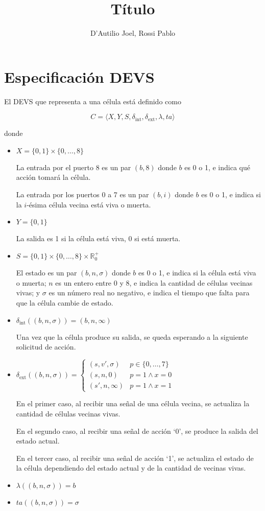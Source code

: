 \documentclass[12pt]{article}
\title{Título}
\author{D'Autilio Joel, Rossi Pablo}
\date{}
\newcommand{\dint}{\delta_{\text{int}}}
\newcommand{\dext}{\delta_{\text{ext}}}
\begin{document}
\maketitle

\section{Especificación DEVS}

El DEVS que representa a una célula está definido como

\[ C = \langle X, Y, S, \dint, \dext, \lambda, ta \rangle \]

donde
\begin{itemize}
  \item $X = \{0, 1\} \times \{0, \dots, 8\}$

    La entrada por el puerto 8 es un par $(b, 8)$ donde $b$ es 0 o 1, e indica qué acción tomará la célula.

    La entrada por los puertos 0 a 7 es un par $(b, i)$ donde $b$ es 0 o 1, e indica si la $i$-ésima célula vecina está viva o muerta.

  \item $Y = \{0, 1\}$

    La salida es 1 si la célula está viva, 0 si está muerta.

  \item $S = \{0, 1\} \times \{0, \dots, 8\} \times \mathbb{R}_0^+$

    El estado es un par $(b, n, \sigma)$ donde $b$ es 0 o 1, e indica si la célula está viva o muerta; $n$ es un entero entre 0 y 8, e indica la cantidad de células vecinas vivas; y $\sigma$ es un número real no negativo, e indica el tiempo que falta para que la célula cambie de estado.

  \item $\dint((b, n, \sigma)) = (b, n, \infty)$

    Una vez que la célula produce su salida, se queda esperando a la siguiente solicitud de acción.

  \item $\dext((b, n, \sigma)) = \begin{cases}
      (s, v', \sigma) & p \in \{0, \dots, 7\} \\
      (s, n, 0) & p = 1 \land x = 0 \\
      (s', n, \infty) & p = 1 \land x = 1
    \end{cases}$

    En el primer caso, al recibir una señal de una célula vecina, se actualiza la cantidad de células vecinas vivas.

    En el segundo caso, al recibir una señal de acción `0', se produce la salida del estado actual.

    En el tercer caso, al recibir una señal de acción `1', se actualiza el estado de la célula dependiendo del estado actual y de la cantidad de vecinas vivas.

  \item $\lambda((b, n, \sigma)) = b$

  \item $ta((b, n, \sigma)) = \sigma$
\end{itemize}
\end{document}
